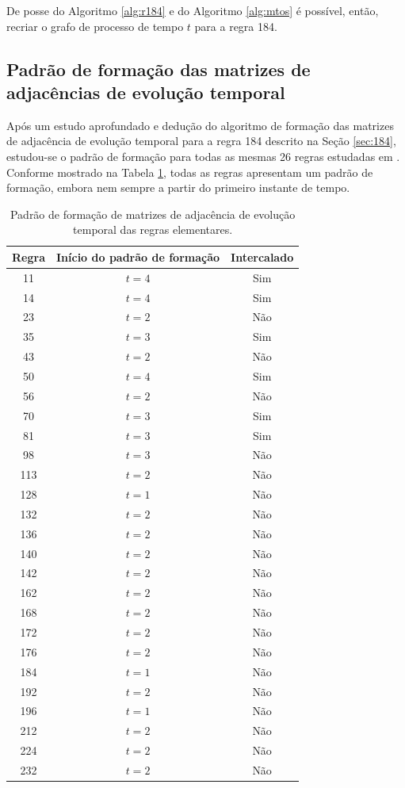 \documentclass[12pt,a4paper]{article}
\begin{document}
De posse do Algoritmo \ref{alg:r184} e do Algoritmo \ref{alg:mtos} é
possível, então, recriar o grafo de processo de tempo $t$ para a regra 184.

\subsection{Padrão de formação das matrizes de adjacências de evolução temporal}\label{sec:pattern}

Após um estudo aprofundado e dedução do algoritmo de formação das matrizes
de adjacência de evolução temporal para a regra 184 descrito na Seção \ref{sec:184},
estudou-se o padrão de formação para todas as mesmas 26 regras estudadas em
. Conforme mostrado na Tabela \ref{tab:pattern},
todas as regras apresentam um padrão de formação, embora nem sempre a
partir do primeiro instante de tempo.

\begin{table}[htp]
\begin{center}
\begin{tabular}{c c c}
\hline
\textbf{Regra} & \textbf{Início do padrão de formação} & \textbf{Intercalado}\\ \hline
 11 & $t=4$ & Sim \\
 14 & $t=4$ & Sim \\
 23 & $t=2$ & Não \\
 35 & $t=3$ & Sim \\
 43 & $t=2$ & Não \\
 50 & $t=4$ & Sim \\
 56 & $t=2$ & Não \\
 70 & $t=3$ & Sim \\
 81 & $t=3$ & Sim \\
 98 & $t=3$ & Não \\
113 & $t=2$ & Não \\
128 & $t=1$ & Não \\
132 & $t=2$ & Não \\
136 & $t=2$ & Não \\
140 & $t=2$ & Não \\
142 & $t=2$ & Não \\
162 & $t=2$ & Não \\
168 & $t=2$ & Não \\
172 & $t=2$ & Não \\
176 & $t=2$ & Não \\
184 & $t=1$ & Não \\
192 & $t=2$ & Não \\
196 & $t=1$ & Não \\
212 & $t=2$ & Não \\
224 & $t=2$ & Não \\
232 & $t=2$ & Não \\
\end{tabular}
\caption{Padrão de formação de matrizes de adjacência de evolução temporal das
regras elementares.}
\label{tab:pattern}
\end{center}
\end{table}
\end{document}
